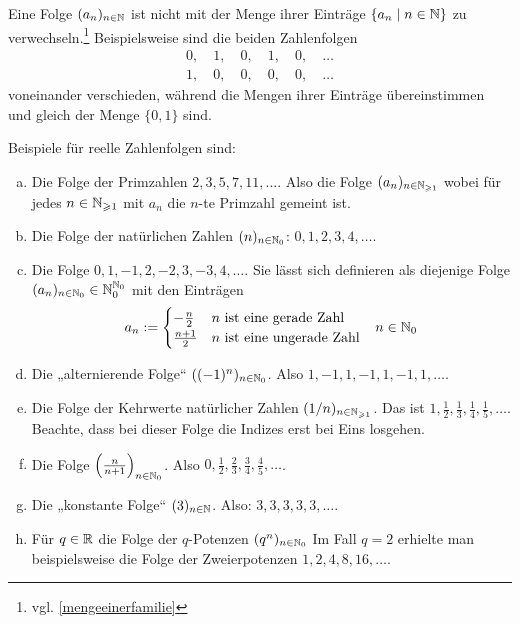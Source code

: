 \begin{bem}
 Eine Folge $(a_n)_{n\in {\mathbb N}}$ ist nicht mit der Menge ihrer Einträge $\{a_n\mid n\in {\mathbb N}\}$ zu verwechseln.\footnote{vgl. \cref{mengeeinerfamilie}} Beispielsweise sind die beiden Zahlenfolgen
 \begin{align*}
  0,\quad 1,\quad 0,\quad 1,\quad 0,\quad \dots \\
  1,\quad 0,\quad 0,\quad 0,\quad 0,\quad \dots 
 \end{align*}
 voneinander verschieden, während die Mengen ihrer Einträge übereinstimmen und gleich der Menge $\{0,1\}$ sind.
\end{bem}



\begin{bsp}
 Beispiele für reelle Zahlenfolgen sind:
 \begin{enumerate}[a)]
  \item Die Folge der Primzahlen $2,3,5,7,11,\dots$. Also die Folge $(a_n)_{n\in {\mathbb N}_{\geqslant 1}}$ wobei für jedes $n\in {\mathbb N}_{\geqslant 1}$ mit $a_n$ die $n$-te Primzahl gemeint ist.
  \item Die Folge der natürlichen Zahlen $(n)_{n\in {\mathbb N}_0}$: $0,1,2,3,4,\dots$.
  \item Die Folge $0,1,-1,2,-2,3,-3,4,\dots$. Sie lässt sich definieren als diejenige Folge $(a_n)_{n\in {\mathbb N}_0}\in {\mathbb N}_0^{{\mathbb N}_0}$ mit den Einträgen
  \begin{align*}
  a_n := \begin{cases}
        -\frac{n}{2} & n\ \text{ist eine gerade Zahl} \\
        \frac{n+1}{2} & n\ \text{ist eine ungerade Zahl}
           \end{cases} && n \in {\mathbb N}_0
\end{align*}
  \item Die „alternierende Folge“ $((-1)^n)_{n\in {\mathbb N}_0}$. Also $1,-1,1,-1,1,-1,1,\dots$.
  \item Die Folge der Kehrwerte natürlicher Zahlen $(1/n)_{n\in {\mathbb N}_{\geqslant 1}}$. Das ist  $1,\frac{1}{2},\frac{1}{3},\frac{1}{4},\frac{1}{5},\dots$. Beachte, dass bei dieser Folge die Indizes erst bei Eins losgehen.
  \item Die Folge $\left(\frac{n}{n+1}\right)_{n\in {\mathbb N}_0}$. Also $0,\frac{1}{2},\frac{2}{3},\frac{3}{4},\frac{4}{5},\dots$.
  \item Die „konstante Folge“ $(3)_{n\in {\mathbb N}}$. Also: $3,3,3,3,3,\dots$.
  \item Für $q\in {\mathbb R}$ die Folge der $q$-Potenzen $(q^n)_{n\in {\mathbb N}_0}$ Im Fall $q=2$ erhielte man beispielsweise die Folge der Zweierpotenzen $1,2,4,8,16,\dots$.

\end{enumerate}
\end{bsp}

